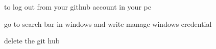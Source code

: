 to log out from your github account in your pc 

go to search bar in windows and write 
manage windows credential 

delete the git hub 
